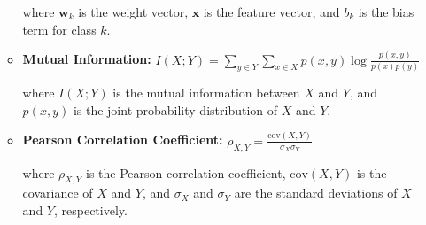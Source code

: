 \documentclass[10pt,svgnames,fragile]{beamer}
\begin{document}
\begin{frame}{}
\begin{itemize}
\begin{itemize}
    where \( \mathbf{w}_k \) is the weight vector, \( \mathbf{x} \) is the feature vector, and \( b_k \) is the bias term for class \( k \).

    \item \textbf{Mutual Information:}
    \(
    I(X;Y) = \sum_{y \in Y} \sum_{x \in X} p(x, y) \log \frac{p(x, y)}{p(x)p(y)}
    \)
    
    where \( I(X; Y) \) is the mutual information between \( X \) and \( Y \), and \( p(x, y) \) is the joint probability distribution of \( X \) and \( Y \).

    \item \textbf{Pearson Correlation Coefficient:}
    \(
    \rho_{X,Y} = \frac{\text{cov}(X, Y)}{\sigma_X \sigma_Y}
    \)
    
    where \( \rho_{X,Y} \) is the Pearson correlation coefficient, \( \text{cov}(X, Y) \) is the covariance of \( X \) and \( Y \), and \( \sigma_X \) and \( \sigma_Y \) are the standard deviations of \( X \) and \( Y \), respectively.
    \end{itemize}

\end{itemize}
\end{frame}
\end{document}
